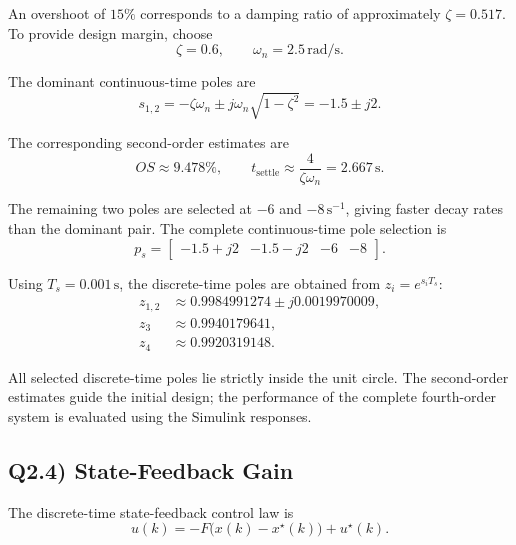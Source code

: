 \documentclass[11pt,a4paper]{article}
\begin{document}
An overshoot of $15\%$ corresponds to a damping ratio of approximately $\zeta=0.517$. To provide design margin, choose
\begin{equation}
    \zeta=0.6,
    \qquad
    \omega_n=2.5\,\mathrm{rad/s}.
\end{equation}

The dominant continuous-time poles are
\begin{equation}
    s_{1,2}
    =-\zeta\omega_n
    \pm j\omega_n\sqrt{1-\zeta^2}
    =-1.5\pm j2.
\end{equation}

The corresponding second-order estimates are
\begin{equation}
    OS \approx 9.478\%,
    \qquad
    t_{\mathrm{settle}}
    \approx\frac{4}{\zeta\omega_n}
    =2.667\,\mathrm{s}.
\end{equation}

The remaining two poles are selected at $-6$ and $-8\,\mathrm{s}^{-1}$, giving faster decay rates than the dominant pair. The complete continuous-time pole selection is
\begin{equation}
    p_s=
    \begin{bmatrix}
        -1.5+j2 & -1.5-j2 & -6 & -8
    \end{bmatrix}.
\end{equation}

Using $T_s=0.001\,\mathrm{s}$, the discrete-time poles are obtained from $z_i=e^{s_iT_s}$:
\begin{align}
    z_{1,2}
    &\approx 0.9984991274 \pm j0.0019970009,\\
    z_3 &\approx 0.9940179641,\\
    z_4 &\approx 0.9920319148.
\end{align}

All selected discrete-time poles lie strictly inside the unit circle. The second-order estimates guide the initial design; the performance of the complete fourth-order system is evaluated using the Simulink responses.

\subsection*{Q2.4) State-Feedback Gain}
The discrete-time state-feedback control law is
\begin{equation}
    u(k)=-F\bigl(x(k)-x^\star(k)\bigr)+u^\star(k).
\end{equation}
\end{document}
